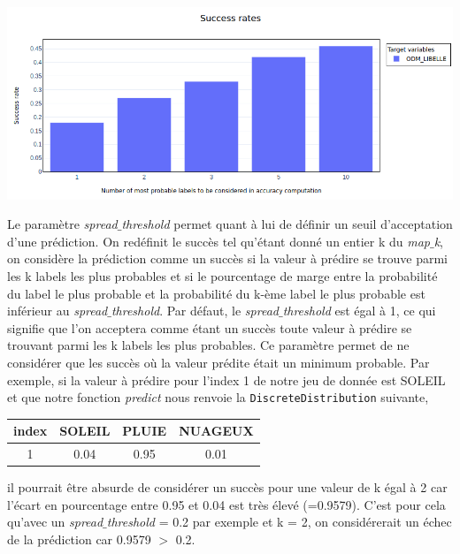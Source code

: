 \begin{center}
\includegraphics[scale=0.4]{figures/rapport_success_rate.png}
\label{fig10}
\end{center}

Le paramètre \textit{spread$\_$threshold} permet quant à lui de définir un seuil d’acceptation d’une prédiction. On redéfinit le succès tel qu’étant donné un entier k du \textit{map$\_$k}, on considère la prédiction comme un succès si la valeur à prédire se trouve parmi les k labels les plus probables et si le pourcentage de marge entre la probabilité du label le plus probable et la probabilité du k-ème label le plus probable est inférieur au \textit{spread$\_$threshold}. Par défaut, le \textit{spread$\_$threshold} est égal à 1, ce qui signifie que l’on acceptera comme étant un succès toute valeur à prédire se trouvant parmi les k labels les plus probables. Ce paramètre permet de ne considérer que les succès où la valeur prédite était un minimum probable. Par exemple, si la valeur à prédire pour l’index 1 de notre jeu de donnée est SOLEIL et que notre fonction \textit{predict} nous renvoie la \texttt{DiscreteDistribution} suivante,

\begin{center}
\begin{tabular}{cccc}
\rowcolor[RGB]{200, 200, 200}index & SOLEIL & PLUIE & NUAGEUX \\
\hline
1 & 0.04 & 0.95 & 0.01

\end{tabular}
\end{center}

il pourrait être absurde de considérer un succès pour une valeur de k égal à 2 car l’écart en pourcentage entre 0.95 et 0.04 est très élevé (=0.9579). C’est pour cela qu’avec un \textit{spread$\_$threshold} = 0.2 par exemple et k = 2, on considérerait un échec de la prédiction car 0.9579 $>$ 0.2.

